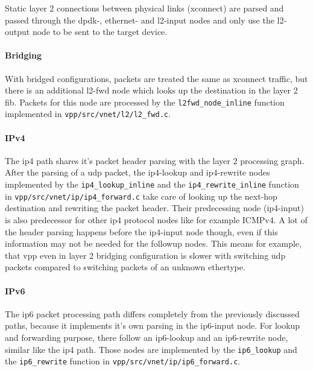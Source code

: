 Static layer 2 connections between physical links (xconnect) are
parsed and passed through the dpdk-, ethernet- and l2-input nodes and
only use the l2-output node to be sent to the target device.

\paragraph{Bridging}

With bridged configurations, packets are treated the same as xconnect
traffic, but there is an additional l2-fwd node which looks up the
destination in the layer 2 \Ac{fib}. Packets for this node are
processed by the \lstinline|l2fwd_node_inline| function implemented in
\lstinline|vpp/src/vnet/l2/l2_fwd.c|.

\paragraph{IPv4}
\label{sec:headerparsing} 

The \Ac{ip4} path shares it's packet header parsing with the layer 2
processing graph. After the parsing of a \Ac{udp} packet, the
ip4-lookup and ip4-rewrite nodes implemented by the
\lstinline|ip4_lookup_inline| and the \lstinline|ip4_rewrite_inline|
function in \lstinline|vpp/src/vnet/ip/ip4_forward.c| take care of
looking up the next-hop destination and rewriting the packet header.
Their predecessing node (ip4-input) is also predecessor for other ip4
protocol nodes like for example ICMPv4. A lot of the header parsing
happens before the ip4-input node though, even if this information may
not be needed for the followup nodes. This means for example, that
\Ac{vpp} even in layer 2 bridging configuration is slower with
switching \Ac{udp} packets compared to switching packets of an unknown
ethertype.

\paragraph{IPv6}

The ip6 packet processing path differs completely from the previously
discussed paths, because it implements it's own parsing in the
ip6-input node. For lookup and forwarding purpose, there follow an
ip6-lookup and an ip6-rewrite node, similar like the ip4 path. Those
nodes are implemented by the \lstinline|ip6_lookup| and the
\lstinline|ip6_rewrite| function in
\lstinline|vpp/src/vnet/ip/ip6_forward.c|.

